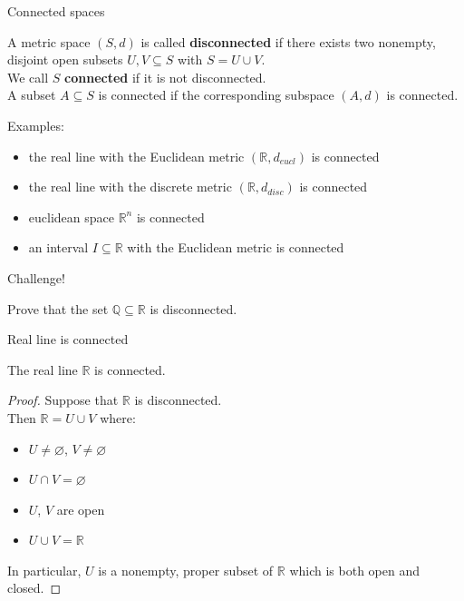 \documentclass{beamer}
\begin{document}
\begin{frame}{Connected spaces}
\begin{defn}
A metric space $(S,d)$ is called \textbf{disconnected} if there exists two nonempty, disjoint open subsets $U,V\subseteq S$ with $S=U\cup V$.\\
\pause
We call $S$ \textbf{connected} if it is not disconnected.\\
\pause
A subset $A\subseteq S$ is connected if the corresponding subspace $(A,d)$ is connected.
\end{defn}
\pause
Examples:
\begin{itemize}
\pause
\item the real line with the Euclidean metric $(\mathbb{R},d_{eucl})$ is connected
\pause
\item the real line with the discrete metric $(\mathbb{R},d_{disc})$ is connected
\pause
\item euclidean space $\mathbb{R}^n$ is connected
\pause
\item an interval $I\subseteq \mathbb{R}$ with the Euclidean metric is connected
\end{itemize}
\end{frame}

\begin{frame}{Challenge!}
\begin{prob}
Prove that the set $\mathbb Q\subseteq \mathbb{R}$ is disconnected.
\end{prob}
\end{frame}

\begin{frame}{Real line is connected}
\begin{thm}
The real line $\mathbb{R}$ is connected.
\end{thm}
\pause
\begin{proof}
\pause
Suppose that $\mathbb{R}$ is disconnected.\\
\pause
Then $\mathbb{R} = U\cup V$ where:
\begin{itemize}
\pause
\item $U\neq\varnothing$, $V\neq\varnothing$
\pause
\item $U\cap V = \varnothing$
\pause
\item $U$, $V$ are open
\pause
\item $U\cup V = \mathbb{R}$
\end{itemize}
\pause
In particular, $U$ is a nonempty, proper subset of $\mathbb{R}$ which is both open and closed.
\end{proof}
\end{frame}
\end{document}
